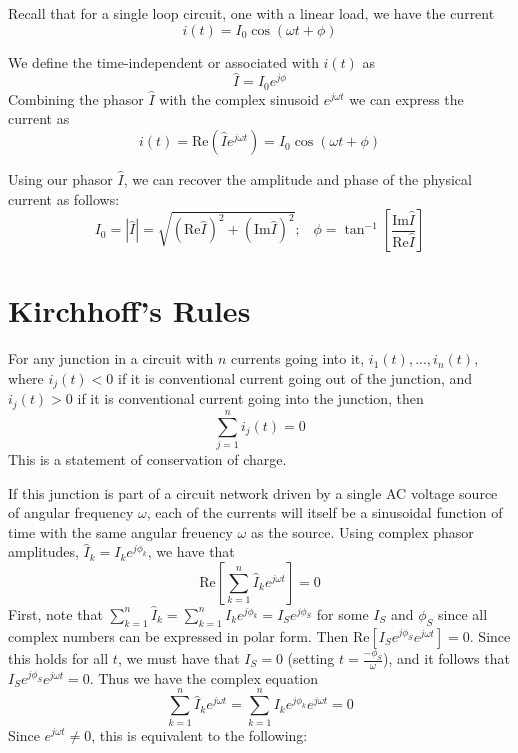 \documentclass[12pt, a4paper, oneside, openright, titlepage]{book}
\begin{document}
Recall that for a single loop circuit, one with a linear load, we have the current $$i(t) = I_0\cos(\omega t+\phi)$$ 

\begin{defn}
    We define the time-independent  or  associated with $i(t)$ as $$\hat{I} = I_0e^{j\phi}$$
    Combining the phasor $\hat{I}$ with the complex sinusoid $e^{j\omega t}$ we can express the current as $$i(t) = \text{Re}\left(\hat{I}e^{j\omega t}\right) = I_0\cos(\omega t+\phi)$$
\end{defn}

Using our phasor $\hat{I}$, we can recover the amplitude and phase of the physical current as follows: $$I_0 = |\hat{I}| = \sqrt{(\text{Re}\hat{I})^2+(\text{Im}\hat{I})^2};\;\;\;\phi = \tan^{-1}\left[\frac{\text{Im}\hat{I}}{\text{Re}\hat{I}}\right]$$

\section{Kirchhoff's Rules}

\begin{thm}
    For any junction in a circuit with $n$ currents going into it, $i_1(t),...,i_n(t)$, where $i_j(t) < 0$ if it is conventional current going out of the junction, and $i_j(t) > 0$ if it is conventional current going into the junction, then $$\sum_{j=1}^ni_j(t) = 0$$ This is a statement of conservation of charge.
\end{thm}

If this junction is part of a circuit network driven by a single AC voltage source of angular frequency $\omega$, each of the currents will itself be a sinusoidal function of time with the same angular freuency $\omega$ as the source. Using complex phasor amplitudes, $\hat{I}_k = I_ke^{j\phi_k}$, we have that $$\text{Re}\left[\sum_{k=1}^n\hat{I}_ke^{j\omega t}\right] = 0$$ First, note that $\sum_{k=1}^n\hat{I}_k = \sum_{k=1}^nI_ke^{j\phi_k} = I_Se^{j\phi_S}$ for some $I_S$ and $\phi_S$ since all complex numbers can be expressed in polar form. Then $\text{Re}\left[I_Se^{j\phi_S}e^{j\omega t}\right]  = 0$. Since this holds for all $t$, we must have that $I_S = 0$ (setting $t = \frac{-\phi_S}{\omega}$), and it follows that $I_Se^{j\phi_S}e^{j\omega t} = 0$. Thus we have the complex equation $$\sum_{k=1}^n\hat{I}_ke^{j\omega t} = \sum_{k=1}^nI_ke^{j\phi_k}e^{j\omega t} = 0$$ Since $e^{j\omega t} \neq 0$, this is equivalent to the following:
\end{document}
